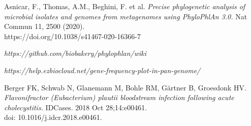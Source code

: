 \documentclass[a4paper,titlepage]{book}
\begin{document}
\begin{thebibliography}{}
Asnicar, F., Thomas, A.M., Beghini, F. et al.
\emph{Precise phylogenetic analysis of microbial isolates and genomes from metagenomes using PhyloPhlAn 3.0.} Nat Commun 11, 2500 (2020).\\ https://doi.org/10.1038/s41467-020-16366-7

\emph{https://github.com/biobakery/phylophlan/wiki}


\emph{https://help.ezbiocloud.net/gene-frequency-plot-in-pan-genome/}

Berger FK, Schwab N, Glanemann M, Bohle RM, Gärtner B, Groesdonk HV. \emph{Flavonifractor (Eubacterium) plautii bloodstream infection following acute cholecystitis.} IDCases. 2018 Oct 28;14:e00461. \\doi: 10.1016/j.idcr.2018.e00461.


\end{thebibliography}
\end{document}
